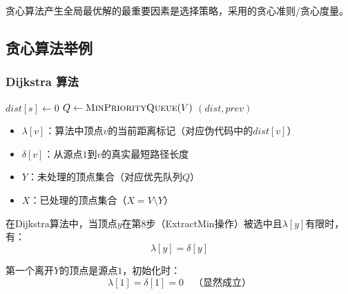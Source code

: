 \documentclass[./../main.tex]{subfiles}
\begin{document}
贪心算法产生全局最优解的最重要因素是选择策略，采用的贪心准则/贪心度量。

\subsection{贪心算法举例}
\subsubsection{Dijkstra 算法}
\begin{algorithm}[t]
    
    \BlankLine
    $dist[s] \gets 0$\;
    \BlankLine
    $Q \gets \textsc{MinPriorityQueue}(V)$ 
    \Return $(dist, prev)$\;
    \caption{Dijkstra 算法}
\end{algorithm}

\begin{itemize}
    \item $\lambda[v]$：算法中顶点$v$的当前距离标记（对应伪代码中的$dist[v]$）
    \item $\delta[v]$：从源点$1$到$v$的真实最短路径长度
    \item $Y$：未处理的顶点集合（对应优先队列$Q$）
    \item $X$：已处理的顶点集合（$X = V \setminus Y$）
\end{itemize}

在Dijkstra算法中，当顶点$y$在第8步（ExtractMin操作）被选中且$\lambda[y]$有限时，有：
$$
\lambda[y] = \delta[y]
$$

第一个离开$Y$的顶点是源点$1$，初始化时：
$$
\lambda[1] = \delta[1] = 0 \quad \text{（显然成立）}
$$
\end{document}
